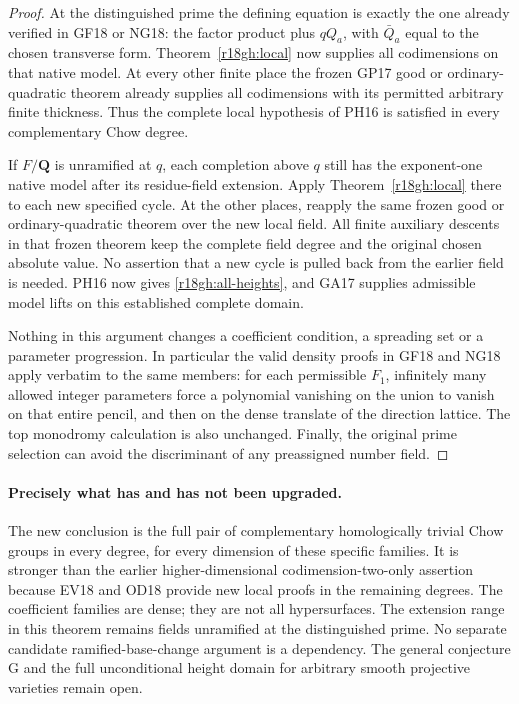 \begin{proof}
At the distinguished prime the defining equation
is exactly the one already verified in GF18 or
NG18: the factor product plus $qQ_a$, with
$\bar Q_a$ equal to the chosen transverse form.
Theorem~\ref{r18gh:local} now supplies all
codimensions on that native model.  At every
other finite place the frozen GP17 good or
ordinary-quadratic theorem already supplies all
codimensions with its permitted arbitrary finite
thickness.  Thus the complete local hypothesis
of PH16 is satisfied in every complementary
Chow degree.

If $F/\mathbf Q$ is unramified at $q$, each
completion above $q$ still has the exponent-one
native model after its residue-field extension.
Apply Theorem~\ref{r18gh:local} there to each
new specified cycle.  At the other places,
reapply the same frozen good or ordinary-quadratic
theorem over the new local field.  All finite
auxiliary descents in that frozen theorem keep
the complete field degree and the original
chosen absolute value.  No assertion that a
new cycle is pulled back from the earlier
field is needed.  PH16 now gives
\eqref{r18gh:all-heights}, and GA17 supplies
admissible model lifts on this established
complete domain.

Nothing in this argument changes a coefficient
condition, a spreading set or a parameter
progression.  In particular the valid density
proofs in GF18 and NG18 apply verbatim to the
same members: for each permissible $F_1$,
infinitely many allowed integer parameters
force a polynomial vanishing on the union
to vanish on that entire pencil, and then
on the dense translate of the direction
lattice.  The top monodromy calculation is
also unchanged.  Finally, the original prime
selection can avoid the discriminant of any
preassigned number field.
\end{proof}

\paragraph{Precisely what has and has not been upgraded.}
The new conclusion is the full pair of complementary
homologically trivial Chow groups in every degree,
for every dimension of these specific families.
It is stronger than the earlier higher-dimensional
codimension-two-only assertion because EV18 and
OD18 provide new local proofs in the remaining
degrees.  The coefficient families are dense;
they are not all hypersurfaces.  The extension
range in this theorem remains fields unramified
at the distinguished prime.  No separate candidate
ramified-base-change argument is a dependency.
The general conjecture G and the full
unconditional height domain for arbitrary
smooth projective varieties remain open.


